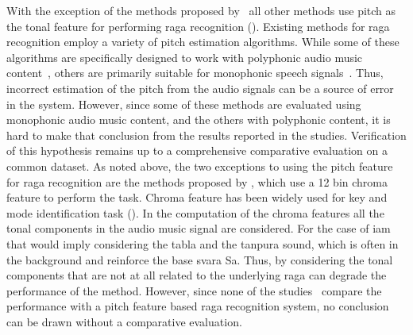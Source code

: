 With the exception of the methods proposed by~\cite{dighe2013scale,dighe2013swara} all other methods use pitch as the tonal feature for performing \gls{raga} recognition (). Existing methods for \gls{raga} recognition employ a variety of pitch estimation algorithms. While some of these algorithms are specifically designed to work with polyphonic audio music content~\citep{Salamon2012}, others are primarily suitable for monophonic speech signals~\citep{BoersmaPaul2001}. Thus, incorrect estimation of the pitch from the audio signals can be a source of error in the system. However, since some of these methods are evaluated using monophonic audio music content, and the others with polyphonic content, it is hard to make that conclusion from the results reported in the studies. Verification of this hypothesis remains up to a comprehensive comparative evaluation on a common dataset. As noted above, the two exceptions to using the pitch feature for \gls{raga} recognition are the methods proposed by \cite{dighe2013scale,dighe2013swara}, which use a 12 bin chroma feature to perform the task. Chroma feature has been widely used for key and mode identification task (). In the computation of the chroma features all the tonal components in the audio music signal are considered. For the case of \gls{iam} that would imply considering the \gls{tabla} and the \gls{tanpura} sound, which is often in the background and reinforce the base \gls{svara} Sa. Thus, by considering the tonal components that are not at all related to the underlying \gls{raga} can degrade the performance of the method. However, since none of the studies~\citep{dighe2013scale,dighe2013swara} compare the performance with a pitch feature based \gls{raga} recognition system, no conclusion can be drawn without a comparative evaluation.

